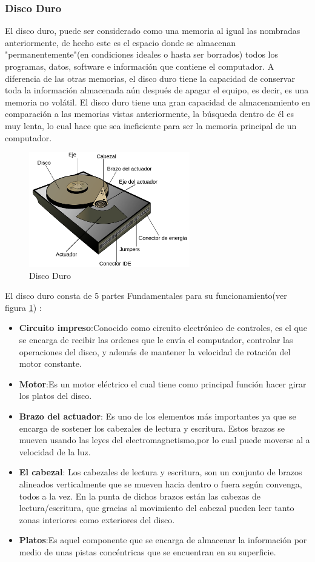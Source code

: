 \documentclass{article}
\begin{document}
\subsubsection{Disco Duro}
El disco duro, puede ser considerado como una memoria al igual las nombradas anteriormente, de hecho este es el espacio donde se almacenan "permanentemente"(en condiciones ideales o hasta ser borrados) todos los programas, datos, software e información que contiene el computador. A diferencia de las otras memorias, el disco duro tiene la capacidad de conservar toda la información almacenada aún después de apagar el equipo, es decir, es una memoria no volátil. El disco duro tiene una gran capacidad de almacenamiento en comparación a las memorias vistas anteriormente, la búsqueda dentro de él es muy lenta, lo cual hace que sea ineficiente para ser la memoria principal de un computador. \cite{disco}


\begin{figure}[h]
\includegraphics[width=7cm]{HDD.png}
\centering
\caption{Disco Duro}
\label{hdd}
\end{figure}

El disco duro consta de 5 partes Fundamentales para su funcionamiento(ver figura \ref{hdd}) \cite{disco}:

\begin{itemize}
    \item \textbf{Circuito impreso}:Conocido como circuito electrónico de controles, es el que se encarga de recibir las ordenes que le envía el computador, controlar  las operaciones del disco, y además de mantener la velocidad de rotación del motor constante.
    \item \textbf{Motor}:Es un motor eléctrico el cual tiene como principal función hacer girar los platos del disco.
    \item \textbf{Brazo del actuador}: Es uno de los elementos más importantes ya que se encarga de sostener los cabezales de lectura y escritura. Estos brazos se mueven usando las leyes del electromagnetismo,por lo cual puede moverse al a velocidad de la luz.
    \item \textbf{El cabezal}: Los cabezales  de lectura y escritura, son un conjunto de brazos alineados verticalmente que se mueven hacia dentro o fuera según convenga, todos a la vez. En la punta de dichos brazos están las cabezas de lectura/escritura, que gracias al movimiento del cabezal pueden leer tanto zonas interiores como exteriores del disco.
    \item \textbf{Platos}:Es aquel componente que se encarga de almacenar la información por medio de unas pistas concéntricas que se encuentran en su superficie.
\end{itemize}
\end{document}
